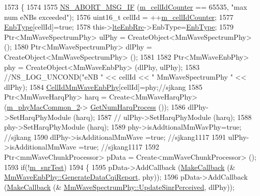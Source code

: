 \begin{DoxyCode}
1573 \{
1574 
1575         \hyperlink{group__fatal_ga6653324225bc139e46deea177614ceee}{NS\_ABORT\_MSG\_IF} (\hyperlink{classns3_1_1MmWaveHelper_a8386109fad3e913312ba2833c0116ea8}{m\_cellIdCounter} == 65535, \textcolor{stringliteral}{"max num eNBs exceeded"});
1576         uint16\_t cellId = ++\hyperlink{classns3_1_1MmWaveHelper_a8386109fad3e913312ba2833c0116ea8}{m\_cellIdCounter};
1577    \hyperlink{classns3_1_1MmWaveHelper_a5da34e3048341219417e4e2c154527e5}{EnbType}[cellId]=\textcolor{keyword}{true};
1578    this->\hyperlink{classns3_1_1MmWaveHelper_a877dec693e5e6669a413ef40e6f7f873}{lteEnbRrc}->EnbType=\hyperlink{classns3_1_1MmWaveHelper_a5da34e3048341219417e4e2c154527e5}{EnbType};
1579         Ptr<MmWaveSpectrumPhy> ulPhy = CreateObject<MmWaveSpectrumPhy> ();
1580         Ptr<MmWaveSpectrumPhy> dlPhy = CreateObject<MmWaveSpectrumPhy> ();
1581 
1582         Ptr<MmWaveEnbPhy> phy = CreateObject<MmWaveEnbPhy> (dlPhy, ulPhy);
1583         \textcolor{comment}{//NS\_LOG\_UNCOND("eNB " << cellId << " MmWaveSpectrumPhy " << dlPhy);}
1584     \hyperlink{classns3_1_1MmWaveHelper_af1bd1010ff8be40be5e86c076acf116d}{CellIdMmWaveEnbPhy}[cellId]=phy;\textcolor{comment}{//sjkang}
1585         Ptr<MmWaveHarqPhy> harq = Create<MmWaveHarqPhy> (\hyperlink{classns3_1_1MmWaveHelper_ab4e9d2f9a49a485dadb3404e8c196f4c}{m\_phyMacCommon\_2}->
      \hyperlink{classns3_1_1MmWavePhyMacCommon_a40773d84172ebeb5aff125f56ebcc5ac}{GetNumHarqProcess} ());
1586         dlPhy->SetHarqPhyModule (harq);
1587 \textcolor{comment}{//      ulPhy->SetHarqPhyModule (harq);}
1588         phy->SetHarqPhyModule (harq);
1589         phy->isAddtionalMmWavPhy=\textcolor{keyword}{true};  \textcolor{comment}{//sjkang}
1590      dlPhy->isAdditionalMmWave =\textcolor{keyword}{true}; \textcolor{comment}{//sjkang1117}
1591      ulPhy->isAdditionalMmWave =\textcolor{keyword}{true}; \textcolor{comment}{//sjkang1117}
1592         Ptr<mmWaveChunkProcessor> pData = Create<mmWaveChunkProcessor> ();
1593         \textcolor{keywordflow}{if}(!\hyperlink{classns3_1_1MmWaveHelper_a8e31c7897807a6d5e9b7acd29cccaf01}{m\_snrTest})
1594         \{
1595                 pData->AddCallback (\hyperlink{group__makecallbackmemptr_ga9376283685aa99d204048d6a4b7610a4}{MakeCallback} (&
      \hyperlink{classns3_1_1MmWaveEnbPhy_a016525ae90876006ff14b0a73c9a33a4}{MmWaveEnbPhy::GenerateDataCqiReport}, phy));
1596                 pData->AddCallback (\hyperlink{group__makecallbackmemptr_ga9376283685aa99d204048d6a4b7610a4}{MakeCallback} (&
      \hyperlink{classns3_1_1MmWaveSpectrumPhy_ad00477c4185055c7fb2b717bb42fd668}{MmWaveSpectrumPhy::UpdateSinrPerceived}, dlPhy));

\end{DoxyCode}
